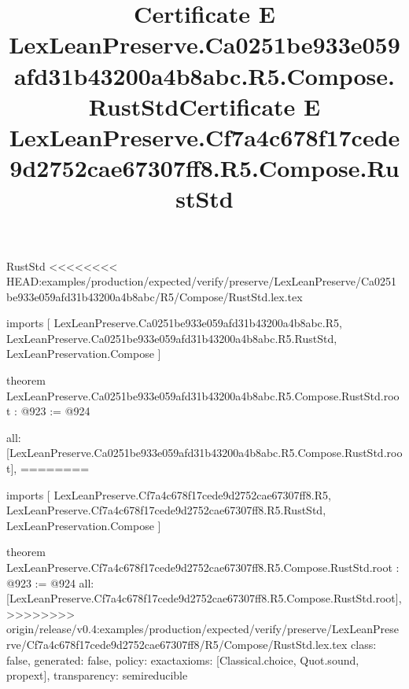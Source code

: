 \begin{lexlean}{RustStd}
<<<<<<<< HEAD:examples/production/expected/verify/preserve/LexLeanPreserve/Ca0251be933e059afd31b43200a4b8abc/R5/Compose/RustStd.lex.tex
\title{Certificate E LexLeanPreserve.Ca0251be933e059afd31b43200a4b8abc.R5.Compose.RustStd}
\begin{coremodule}
imports [
  LexLeanPreserve.Ca0251be933e059afd31b43200a4b8abc.R5,
  LexLeanPreserve.Ca0251be933e059afd31b43200a4b8abc.R5.RustStd,
  LexLeanPreservation.Compose
]

theorem LexLeanPreserve.Ca0251be933e059afd31b43200a4b8abc.R5.Compose.RustStd.root : @923 := @924 {
  all: [LexLeanPreserve.Ca0251be933e059afd31b43200a4b8abc.R5.Compose.RustStd.root],
========
\title{Certificate E LexLeanPreserve.Cf7a4c678f17cede9d2752cae67307ff8.R5.Compose.RustStd}
\begin{coremodule}
imports [
  LexLeanPreserve.Cf7a4c678f17cede9d2752cae67307ff8.R5,
  LexLeanPreserve.Cf7a4c678f17cede9d2752cae67307ff8.R5.RustStd,
  LexLeanPreservation.Compose
]

theorem LexLeanPreserve.Cf7a4c678f17cede9d2752cae67307ff8.R5.Compose.RustStd.root : @923 := @924 {
  all: [LexLeanPreserve.Cf7a4c678f17cede9d2752cae67307ff8.R5.Compose.RustStd.root],
>>>>>>>> origin/release/v0.4:examples/production/expected/verify/preserve/LexLeanPreserve/Cf7a4c678f17cede9d2752cae67307ff8/R5/Compose/RustStd.lex.tex
  class: false,
  generated: false,
  policy: exact{axioms: [Classical.choice, Quot.sound, propext]},
  transparency: semireducible
}


\end{coremodule}}
\end{coremodule}
\end{lexlean}
